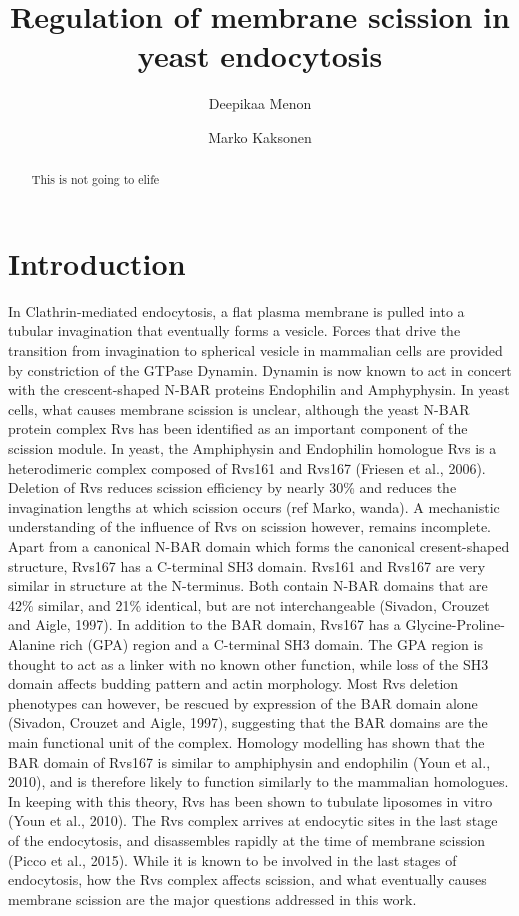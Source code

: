 \documentclass[9pt,lineno]{elife}
\title{Regulation of membrane scission in yeast endocytosis}
\author[1]{Deepikaa Menon}
\author[1*]{Marko Kaksonen}
\affil[1]{Department of Biochemistry, University of Geneva, Geneva, Switzerland}
\begin{document}
\maketitle

\begin{abstract}
This is not going to elife
\end{abstract}


\section{Introduction}

In Clathrin-mediated endocytosis, a flat plasma membrane is pulled into a tubular invagination that eventually forms a vesicle. Forces that drive the transition from invagination to spherical vesicle in mammalian cells are provided by constriction of the GTPase Dynamin. Dynamin is now known to act in concert with the crescent-shaped N-BAR proteins Endophilin and Amphyphysin. In yeast cells, what causes membrane scission is unclear, although the yeast N-BAR protein complex Rvs has been identified as an important component of the scission module.  In yeast, the Amphiphysin and Endophilin homologue Rvs is a heterodimeric complex composed of Rvs161 and Rvs167 (Friesen et al., 2006). Deletion of Rvs reduces scission efficiency by nearly 30\% and reduces the invagination lengths at which scission occurs (ref Marko, wanda). A mechanistic understanding of the influence of Rvs on scission however, remains incomplete. Apart from a canonical N-BAR domain which forms the canonical cresent-shaped structure, Rvs167 has a C-terminal SH3 domain. Rvs161 and Rvs167 are very similar in structure at the N-terminus. Both contain N-BAR domains that are 42\% similar, and 21\% identical, but are not interchangeable (Sivadon, Crouzet and Aigle, 1997). In addition to the BAR domain, Rvs167 has a Glycine-Proline-Alanine rich (GPA) region and a C-terminal SH3 domain. The GPA region is thought to act as a linker with no known other function, while loss of the SH3 domain affects budding pattern and actin morphology. Most Rvs deletion phenotypes can however, be rescued by expression of the BAR domain alone (Sivadon, Crouzet and Aigle, 1997), suggesting that the BAR domains are the main functional unit of the complex. Homology modelling has shown that the BAR domain of Rvs167 is similar to amphiphysin and endophilin (Youn et al., 2010), and is therefore likely to function similarly to the mammalian homologues. In keeping with this theory, Rvs has been shown to tubulate liposomes in vitro (Youn et al., 2010). The Rvs complex arrives at endocytic sites in the last stage of the endocytosis, and disassembles rapidly at the time of membrane scission (Picco et al., 2015). While it is known to be involved in the last stages of endocytosis, how the Rvs complex affects scission, and what eventually causes membrane scission are the major questions addressed in this work. 
\end{document}

